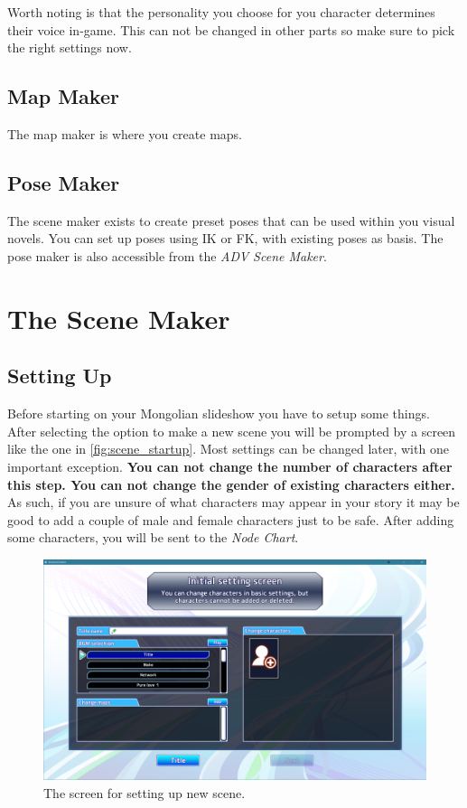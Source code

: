 \documentclass{report}
\begin{document}
Worth noting is that the personality you choose for you character determines their voice in-game. This can not be changed in other parts so make sure to pick the right settings now.

\section{Map Maker}

The map maker is where you create maps.

\section{Pose Maker}

The scene maker exists to create preset poses that can be used within you visual novels. You can set up poses using IK or FK, with existing poses as basis. The pose maker is also accessible from the \textit{ADV Scene Maker}.

\chapter{The Scene Maker}

\section{Setting Up}

Before starting on your Mongolian slideshow you have to setup some things. After selecting the option to make a new scene you will be prompted by a screen like the one in \autoref{fig:scene_startup}. Most settings can be changed later, with one important exception.
\textbf{You can not change the number of characters after this step. You can not change the gender of existing characters either.} As such, if you are unsure of what characters may appear in your story it may be good to add a couple of male and female characters just to be safe. After adding some characters, you will be sent to the \textit{Node Chart}.

\begin{figure}[!htpb]
    \centering
    \includegraphics[width=\textwidth]{Figures/scene_startup.PNG}
    \caption{The screen for setting up new scene.}
    \label{fig:scene_startup}
\end{figure}
\end{document}
